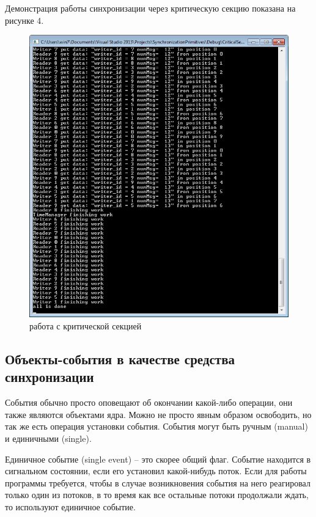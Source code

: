 \documentclass[a4paper, 12pt]{article}		%
\begin{document}
Демонстрация работы синхронизации через критическую секцию показана на рисунке 4.

\begin{figure}[h!]
\centering
\includegraphics[scale=1]{res/003}
\caption{работа с критической секцией}
\end{figure}

\newpage
\subsection{Объекты-события в качестве средства синхронизации}

События обычно просто оповещают об окончании какой-либо операции, они также являются объектами ядра. Можно не просто явным образом освободить, но так же есть операция установки события. События могут быть ручным (manual) и единичными (single).

Единичное событие (single event) – это скорее общий флаг. Событие находится в сигнальном состоянии, если его установил какой-нибудь поток. Если для работы программы требуется, чтобы в случае возникновения события на него реагировал только один из потоков, в то время как все остальные потоки продолжали ждать, то используют единичное событие.
\end{document}
